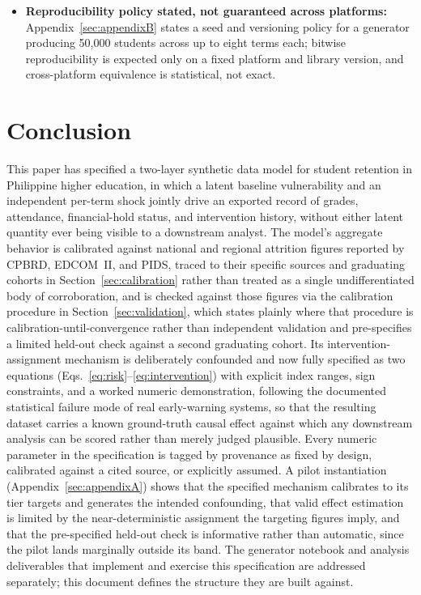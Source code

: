 \documentclass[11pt]{article}
\begin{document}
\begin{itemize}[topsep=2pt,itemsep=3pt,parsep=0pt]
\item \textbf{Reproducibility policy stated, not guaranteed across platforms:} Appendix~\ref{sec:appendixB} states a seed and versioning policy for a generator producing 50,000 students across up to eight terms each; bitwise reproducibility is expected only on a fixed platform and library version, and cross-platform equivalence is statistical, not exact.
\end{itemize}


\FloatBarrier
\section{Conclusion}
\label{sec:conclusion}

This paper has specified a two-layer synthetic data model for student retention in Philippine higher education, in which a latent baseline vulnerability and an independent per-term shock jointly drive an exported record of grades, attendance, financial-hold status, and intervention history, without either latent quantity ever being visible to a downstream analyst. The model's aggregate behavior is calibrated against national and regional attrition figures reported by CPBRD, EDCOM~II, and PIDS, traced to their specific sources and graduating cohorts in Section~\ref{sec:calibration} rather than treated as a single undifferentiated body of corroboration, and is checked against those figures via the calibration procedure in Section~\ref{sec:validation}, which states plainly where that procedure is calibration-until-convergence rather than independent validation and pre-specifies a limited held-out check against a second graduating cohort. Its intervention-assignment mechanism is deliberately confounded and now fully specified as two equations (Eqs.~\ref{eq:risk}--\ref{eq:intervention}) with explicit index ranges, sign constraints, and a worked numeric demonstration, following the documented statistical failure mode of real early-warning systems, so that the resulting dataset carries a known ground-truth causal effect against which any downstream analysis can be scored rather than merely judged plausible. Every numeric parameter in the specification is tagged by provenance as fixed by design, calibrated against a cited source, or explicitly assumed. A pilot instantiation (Appendix~\ref{sec:appendixA}) shows that the specified mechanism calibrates to its tier targets and generates the intended confounding, that valid effect estimation is limited by the near-deterministic assignment the targeting figures imply, and that the pre-specified held-out check is informative rather than automatic, since the pilot lands marginally outside its band. The generator notebook and analysis deliverables that implement and exercise this specification are addressed separately; this document defines the structure they are built against.
\end{document}
